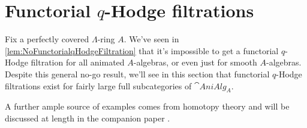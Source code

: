\documentclass[DIV=12,numbers=enddot,leqno,bibliography=totoc]{scrartcl}
\begin{document}
	
	
	\newpage
	
	\section{Functorial \texorpdfstring{$q$}{q}-Hodge filtrations}\label{sec:FunctorialqHodge}
	Fix a perfectly covered $\Lambda$-ring $A$. We've seen in \cref{lem:NoFunctorialqHodgeFiltration} that it's impossible to get a functorial $q$-Hodge filtration for all animated $A$-algebras, or even just for smooth $A$-algebras. Despite this general no-go result, we'll see in this section that functorial $q$-Hodge filtrations exist for fairly large full subcategories of $\cat{AniAlg}_A$.
	
	A further ample source of examples comes from homotopy theory and will be discussed at length in the companion paper \cite{qdeRhamku}.
	
\end{document}
